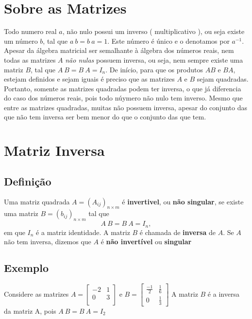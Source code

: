 \documentclass{article}
\begin{document}
\section{Sobre as Matrizes}

Todo numero real $a$, não nulo possui um inverso ( multiplicativo ), ou seja existe um número $b$,
 tal que $a\ b = b\ a = 1$. Este número é único e o denotamos por $a^{-1}$. 
 Apesar da álgebra matricial ser semalhante à álgebra dos números reais, nem todas as matrizes
  $A$ \textit{não nulas} possuem inversa, ou seja, nem sempre existe uma matriz $B$, tal que $A\ B = B\ A = I_n$.
  De início, para que os produtos $AB$ e $BA$, estejam definidos e sejam iguais é preciso que 
  as matrizes $A$ e $B$ sejam quadradas. Portanto, somente as matrizes quadradas podem ter inversa, o que já diferencia
  do caso dos números reais, pois todo núymero não nulo tem inverso. Mesmo que entre as matrizes quadradas, muitas não possuem inversa, 
  apesar do conjunto das que não tem inversa ser bem menor do que o conjunto das que tem.
   

\section{Matriz Inversa}
\subsection{Definição}
Uma matriz quadrada $A = (A_{ij})_{n \times m}$ é \textbf{invertivel}, ou \textbf{não singular}, se existe uma matriz
$B = (b_{ij})_{n \times m}$ tal que
$$A \ B = B \ A = I_n,$$
em que $I_n$ é a matriz identidade. A matriz $B$ é chamada de \textbf{inversa} de $A$. Se $A$ não tem inversa,
 dizemos que $A$ é \textbf{não invertível} ou \textbf{singular}
\subsection{Exemplo}
Considere as matrizes \bigbreak
$
  A = 
  \begin{bmatrix}
    -2 & 1 \\
    0 & 3 \\ 
  \end{bmatrix}
$ e 
$
B = 
\begin{bmatrix}
\frac{-1}{2} & \frac{1}{6} \\
0 & \frac{1}{3}
\end{bmatrix}
$
\bigbreak
A matriz $B$ é a inversa da matriz A, pois $A \ B = B \ A = I_2$

\bigbreak
\end{document}

